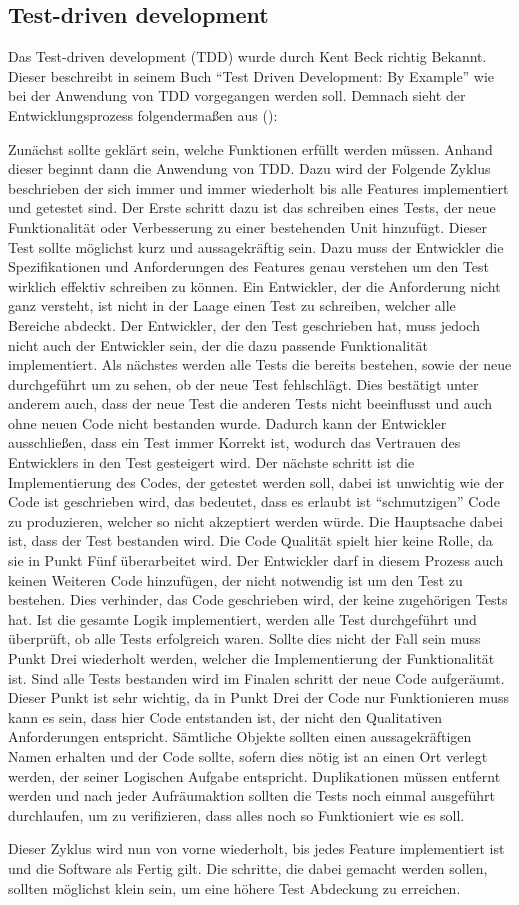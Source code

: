 \subsection{Test-driven development}\label{einleitung:tdd}
Das Test-driven development (TDD) wurde durch Kent Beck richtig Bekannt. Dieser
beschreibt in seinem Buch "`Test Driven Development: By Example"' wie bei der
Anwendung von TDD vorgegangen werden soll. Demnach sieht der Entwicklungsprozess
folgendermaßen aus (\cite{beck:tdd}):

Zunächst sollte geklärt sein, welche Funktionen erfüllt werden müssen. Anhand
dieser beginnt dann die Anwendung von TDD. Dazu wird der Folgende Zyklus
beschrieben der sich immer und immer wiederholt bis alle Features implementiert
und getestet sind.
Der Erste schritt dazu ist das schreiben eines Tests, der neue Funktionalität
oder Verbesserung zu einer bestehenden Unit hinzufügt. Dieser Test sollte
möglichst kurz und aussagekräftig sein. Dazu muss der Entwickler die
Spezifikationen und Anforderungen des Features genau verstehen um den Test
wirklich effektiv schreiben zu können. Ein Entwickler, der die Anforderung
nicht ganz versteht, ist nicht in der Laage einen Test zu schreiben, welcher
alle Bereiche abdeckt. Der Entwickler, der den Test geschrieben hat, muss
jedoch nicht auch der Entwickler sein, der die dazu passende Funktionalität
implementiert.
Als nächstes werden alle Tests die bereits bestehen, sowie der neue
durchgeführt um zu sehen, ob der neue Test fehlschlägt. Dies bestätigt unter
anderem auch, dass der neue Test die anderen Tests nicht beeinflusst und auch
ohne neuen Code nicht bestanden wurde. Dadurch kann der Entwickler
ausschließen, dass ein Test immer Korrekt ist, wodurch das Vertrauen des
Entwicklers in den Test gesteigert wird.
Der nächste schritt ist die Implementierung des Codes, der getestet werden soll,
dabei ist unwichtig wie der Code ist geschrieben wird, das bedeutet, dass es
erlaubt ist "`schmutzigen"' Code zu produzieren, welcher so nicht akzeptiert
werden würde. Die Hauptsache dabei ist, dass der Test bestanden wird. Die Code
Qualität spielt hier keine Rolle, da sie in Punkt Fünf überarbeitet wird.
Der Entwickler darf in diesem Prozess auch keinen Weiteren Code hinzufügen, der
nicht notwendig ist um den Test zu bestehen. Dies verhinder, das Code
geschrieben wird, der keine zugehörigen Tests hat.
Ist die gesamte Logik implementiert, werden alle Test durchgeführt und
überprüft, ob alle Tests erfolgreich waren. Sollte dies nicht der Fall sein
muss Punkt Drei wiederholt werden, welcher die Implementierung der
Funktionalität ist.
Sind alle Tests bestanden wird im Finalen schritt der neue Code aufgeräumt.
Dieser Punkt ist sehr wichtig, da in Punkt Drei der Code nur Funktionieren muss
kann es sein, dass hier Code entstanden ist, der nicht den Qualitativen
Anforderungen entspricht. Sämtliche Objekte sollten einen aussagekräftigen
Namen erhalten und der Code sollte, sofern dies nötig ist an einen Ort verlegt
werden, der seiner Logischen Aufgabe entspricht. Duplikationen müssen entfernt
werden und nach jeder Aufräumaktion sollten die Tests noch einmal ausgeführt
durchlaufen, um zu verifizieren, dass alles noch so Funktioniert wie es soll.

Dieser Zyklus wird nun von vorne wiederholt, bis jedes Feature implementiert
ist und die Software als Fertig gilt. Die schritte, die dabei gemacht werden
sollen, sollten möglichst klein sein, um eine höhere Test Abdeckung zu
erreichen.
